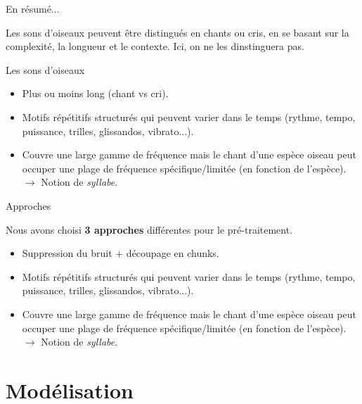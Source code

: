 \documentclass[compress,xcolor=table]{beamer}
\begin{document}
\begin{frame}{En résumé...}

    Les sons d'oiseaux peuvent être distingués en chants ou cris, en se basant sur la complexité, la longueur et le contexte. Ici, on ne les dinstinguera pas.

    \begin{block}{Les sons d'oiseaux}
        \begin{itemize}
            \item Plus ou moins long (chant vs cri).
            \item Motifs répétitifs structurés qui peuvent varier dans le temps (rythme, tempo, puissance, trilles, glissandos, vibrato...).
            \item Couvre une large gamme de fréquence mais le chant d'une espèce oiseau peut occuper une plage de fréquence spécifique/limitée (en fonction de l'espèce).\\
                  $\rightarrow$ Notion de \textit{syllabe}.
        \end{itemize}
    \end{block}

\end{frame}

\begin{frame}{Approches}

    Nous avons choisi \textbf{3 approches} différentes pour le pré-traitement.

    \begin{block}{}
        \begin{itemize}
            \item Suppression du bruit + découpage en chunks.
            \item Motifs répétitifs structurés qui peuvent varier dans le temps (rythme, tempo, puissance, trilles, glissandos, vibrato...).
            \item Couvre une large gamme de fréquence mais le chant d'une espèce oiseau peut occuper une plage de fréquence spécifique/limitée (en fonction de l'espèce).\\
                  $\rightarrow$ Notion de \textit{syllabe}.
        \end{itemize}
    \end{block}

\end{frame}

\section{Modélisation} \subsection{}
\end{document}
